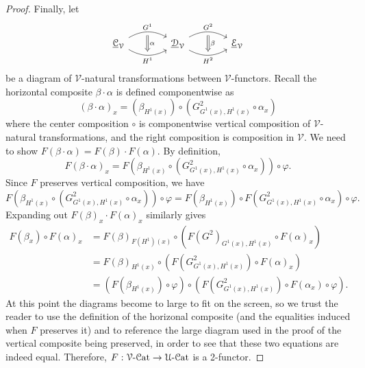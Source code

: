 \begin{proof}
	Finally, let
	\[\begin{tikzcd}[row sep = 2.5em, column sep = 4em]
	\underline{\mathcal{C}}_{\mathcal{V}} & \underline{\mathcal{D}}_{\mathcal{V}} & \underline{\mathcal{E}}_{\mathcal{V}}
	\arrow[""{name=0, anchor=center, inner sep=0}, "{G^1}", bend left=30, from=1-1, to=1-2]
	\arrow[""{name=1, anchor=center, inner sep=0}, "{H^1}"', bend right=30, from=1-1, to=1-2]
	\arrow[""{name=2, anchor=center, inner sep=0}, "{G^2}", bend left=30, from=1-2, to=1-3]
	\arrow[""{name=3, anchor=center, inner sep=0}, "{H^2}"', bend right=30, from=1-2, to=1-3]
	\arrow["\alpha", shorten <=3pt, shorten >=3pt, Rightarrow, from=0, to=1]
	\arrow["\beta", shorten <=3pt, shorten >=3pt, Rightarrow, from=2, to=3]
\end{tikzcd}\]
	be a diagram of $\mathcal{V} $-natural transformations between $\mathcal{V} $-functors. Recall the horizontal composite $\beta \cdot \alpha$ is defined componentwise as
	\[
		(\beta\cdot \alpha)_x=(\beta_{H^1(x)} )\circ \left( G^2_{G^1(x),H^1(x)} \circ\alpha_x \right) 
	\]
	where the center composition $\circ $ is componentwise vertical composition of $\mathcal{V} $-natural transformations, and the right composition is composition in $\mathcal{V} $. We need to show $F(\beta\cdot \alpha)=F(\beta)\cdot F(\alpha)$. By definition,
	\[
		F(\beta\cdot \alpha)_x=F\left( \beta_{H^1(x)} \circ \left( G^2_{G^1(x),H^1(x)} \circ \alpha_x \right)  \right) \circ \varphi
	.\]
	Since $F$ preserves vertical composition, we have
	\[
		F\left( \beta_{H^1(x)} \circ \left( G^2_{G^1(x),H^1(x)} \circ \alpha_x \right)  \right) \circ \varphi = F(\beta_{H^1(x)} ) \circ  F\left( G^2_{G^1(x),H^1(x)} \circ \alpha_x \right) \circ \varphi
	.\]
	Expanding out $F(\beta)_x\cdot F(\alpha)_x$ similarly gives
	\begin{align*}
		F(\beta_x)\circ F(\alpha)_x&=F(\beta)_{F(H^1)(x)} \circ \left( F\left(G^2\right)_{G^1(x),H^1(x)} \circ F(\alpha)_x \right) \\
					   &=F(\beta)_{H^1(x)} \circ \left( F\left( G^2_{G^1(x),H^1(x)} \right) \circ F(\alpha)_x \right) \\
					   &=(F(\beta_{H^1(x)} )\circ \varphi) \circ \left( F\left( G^2_{G^1(x),H^1(x)} \right) \circ F(\alpha_x)\circ \varphi \right)
	.\end{align*}
	At this point the diagrams become to large to fit on the screen, so we trust the reader to use the definition of the horizonal composite (and the equalities induced when $F$ preserves it) and to reference the large diagram used in the proof of the vertical composite being preserved, in order to see that these two equations are indeed equal. Therefore, $F : \mathcal{V} \text{-} \mathcal{C}\mathrm{at}  \to \mathcal{U} \text{-} \mathcal{C}\mathrm{at} $ is a 2-functor.


\end{proof}
